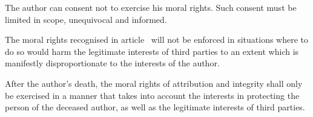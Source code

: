 \begin{contract}
\label{Par:Consent}
\Sentence The author can consent not to exercise his moral rights. \Sentence Such consent must be limited in scope, unequivocal and informed.

\label{Par:InterestsOfThirdParties}
\Sentence  The moral rights recognised in article~ will not be enforced in situations 
where to do so would harm the legitimate interests of third parties to
an extent which is manifestly disproportionate to the interests of the
author.

\Sentence  After the author's death, the moral rights of attribution and integrity
shall only be exercised in a manner that takes into account the interests
in protecting the person of the deceased author, as well as the legitimate
interests of third parties.

\end{contract}